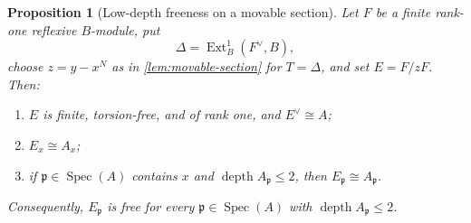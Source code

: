 \documentclass[reqno]{amsart}
\theoremstyle{plain}
\newtheorem{proposition}[theorem]{Proposition}
\theoremstyle{definition}
\newcommand{\Spec}{\operatorname{Spec}}
\newcommand{\depth}{\operatorname{depth}}
\newcommand{\Ext}{\operatorname{Ext}}
\begin{document}
\begin{proposition}[Low-depth freeness on a movable section]
\label{prop:section-freeness}
Let $F$ be a finite rank-one reflexive $B$-module, put
\[
  \Delta=\Ext^1_B(F^\vee,B),
\]
choose $z=y-x^N$ as in \cref{lem:movable-section} for $T=\Delta$, and set
$E=F/zF$.  Then:
\begin{enumerate}[label=\textup{(\roman*)}]
  \item $E$ is finite, torsion-free, and of rank one, and
        $E^\vee\cong A$;
  \item $E_x\cong A_x$;
  \item if $\mathfrak p\in\Spec(A)$ contains $x$ and
        $\depth A_{\mathfrak p}\leq2$, then
        $E_{\mathfrak p}\cong A_{\mathfrak p}$.
\end{enumerate}
Consequently, $E_{\mathfrak p}$ is free for every
$\mathfrak p\in\Spec(A)$ with $\depth A_{\mathfrak p}\leq2$.
\end{proposition}
\end{document}
